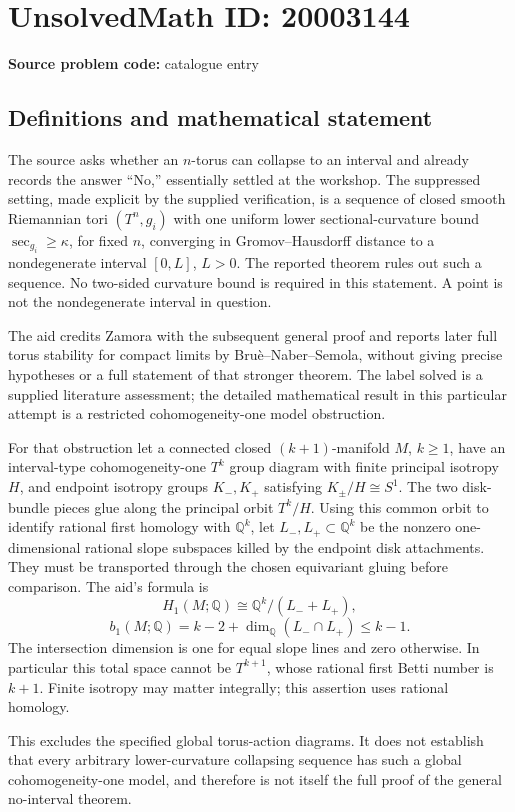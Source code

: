 \documentclass[11pt]{article}
\newcommand{\Q}{\mathbb{Q}}
\begin{document}
\section*{UnsolvedMath ID: 20003144}
\textbf{Source problem code:} catalogue entry
\subsection{Definitions and mathematical statement}
The source asks whether an $n$-torus can collapse to an interval and already records the answer ``No,'' essentially settled at the workshop. The suppressed setting, made explicit by the supplied verification, is a sequence of closed smooth Riemannian tori $(T^n,g_i)$ with one uniform lower sectional-curvature bound $\sec_{g_i}\geq\kappa$, for fixed $n$, converging in Gromov--Hausdorff distance to a nondegenerate interval $[0,L]$, $L>0$. The reported theorem rules out such a sequence. No two-sided curvature bound is required in this statement. A point is not the nondegenerate interval in question.

The aid credits Zamora with the subsequent general proof and reports later full torus stability for compact limits by Bru\`e--Naber--Semola, without giving precise hypotheses or a full statement of that stronger theorem. The label solved is a supplied literature assessment; the detailed mathematical result in this particular attempt is a restricted cohomogeneity-one model obstruction.

For that obstruction let a connected closed $(k+1)$-manifold $M$, $k\geq1$, have an interval-type cohomogeneity-one $T^k$ group diagram with finite principal isotropy $H$, and endpoint isotropy groups $K_-,K_+$ satisfying $K_\pm/H\cong S^1$. The two disk-bundle pieces glue along the principal orbit $T^k/H$. Using this common orbit to identify rational first homology with $\Q^k$, let $L_-,L_+\subset\Q^k$ be the nonzero one-dimensional rational slope subspaces killed by the endpoint disk attachments. They must be transported through the chosen equivariant gluing before comparison. The aid's formula is
\[
 H_1(M;\Q)\cong\Q^k/(L_-+L_+),
\]
\[
 b_1(M;\Q)=k-2+\dim_{\Q}(L_-\cap L_+)\leq k-1.
\]
The intersection dimension is one for equal slope lines and zero otherwise. In particular this total space cannot be $T^{k+1}$, whose rational first Betti number is $k+1$. Finite isotropy may matter integrally; this assertion uses rational homology.

This excludes the specified global torus-action diagrams. It does not establish that every arbitrary lower-curvature collapsing sequence has such a global cohomogeneity-one model, and therefore is not itself the full proof of the general no-interval theorem.
\end{document}
